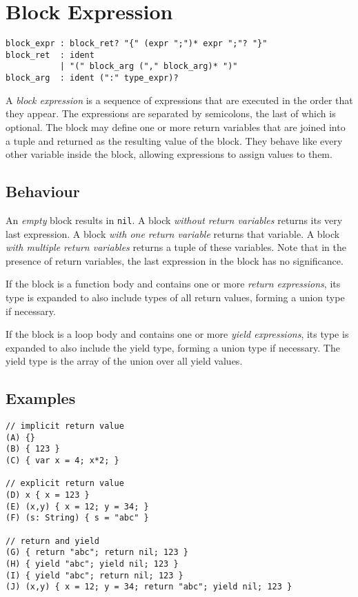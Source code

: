 \section{Block Expression}

\begin{lstlisting}[language=EBNF]
block_expr : block_ret? "{" (expr ";")* expr ";"? "}"
block_ret  : ident
           | "(" block_arg ("," block_arg)* ")"
block_arg  : ident (":" type_expr)?
\end{lstlisting}

A \emph{block expression} is a sequence of expressions that are executed in the
order that they appear. The expressions are separated by semicolons, the last of
which is optional. The block may define one or more return variables that are
joined into a tuple and returned as the resulting value of the block. They
behave like every other variable inside the block, allowing expressions to
assign values to them.

\subsection{Behaviour}

An \emph{empty} block results in \lstinline{nil}. A block \emph{without return
variables} returns its very last expression. A block \emph{with one return
variable} returns that variable. A block \emph{with multiple return variables}
returns a tuple of these variables. Note that in the presence of return
variables, the last expression in the block has no significance.

If the block is a function body and contains one or more \emph{return
expressions}, its type is expanded to also include types of all return values,
forming a union type if necessary.

If the block is a loop body and contains one or more \emph{yield expressions},
its type is expanded to also include the yield type, forming a union type if
necessary. The yield type is the array of the union over all yield values.

\subsection{Examples}

\begin{lstlisting}
// implicit return value
(A) {}
(B) { 123 }
(C) { var x = 4; x*2; }

// explicit return value
(D) x { x = 123 }
(E) (x,y) { x = 12; y = 34; }
(F) (s: String) { s = "abc" }

// return and yield
(G) { return "abc"; return nil; 123 }
(H) { yield "abc"; yield nil; 123 }
(I) { yield "abc"; return nil; 123 }
(J) (x,y) { x = 12; y = 34; return "abc"; yield nil; 123 }
\end{lstlisting}

